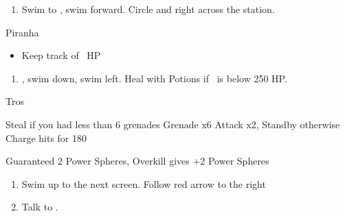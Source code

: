 \begin{enumerate}[resume]
    \item Swim to \save, swim forward. Circle and right across the station.
\end{enumerate}
\begin{battle}{Piranha}
    \begin{itemize}
        \rikkuf Steal Grenades from each set
        \tidusf Attack
        \item Keep track of \rikku\ HP
    \end{itemize}
\end{battle}
\begin{enumerate}[resume]
    \item \cs, swim down, swim left. Heal with Potions if \rikku\ is below 250 HP.
\end{enumerate}
\begin{battle}[2200]{Tros}
    \begin{itemize}
        \rikkuf Steal if you had less than 6 grenades
        \rikkuf Grenade x6
        \tidusf Attack x2, Standby otherwise
        \enemyf Charge hits for 180
    \end{itemize}
    Guaranteed 2 Power Spheres, Overkill gives +2 Power Spheres
\end{battle}
\begin{enumerate}[resume]
    \item Swim up to the next screen. Follow red arrow to the right
    \item Talk to \rikku.
\end{enumerate}
